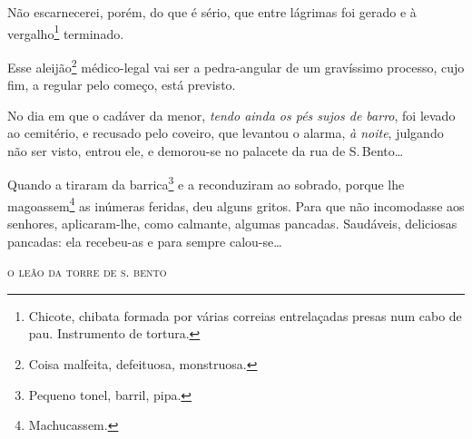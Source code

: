 Não escarnecerei, porém, do que é sério, que entre lágrimas foi gerado e
à vergalho\footnote{Chicote, chibata formada por várias correias
  entrelaçadas presas num cabo de pau. Instrumento de tortura.}
terminado.

Esse aleijão\footnote{Coisa malfeita, defeituosa, monstruosa.}
médico-legal vai ser a pedra-angular de um gravíssimo processo, cujo
fim, a regular pelo começo, está previsto.

No dia em que o cadáver da menor, \emph{tendo ainda os pés sujos de
barro}, foi levado ao cemitério, e recusado pelo coveiro, que levantou o
alarma, \emph{à noite}, julgando não ser visto, entrou ele, e demorou-se
no palacete da rua de S.\,Bento\ldots{}

Quando a tiraram da barrica\footnote{Pequeno tonel, barril, pipa.} e a
reconduziram ao sobrado, porque lhe magoassem\footnote{Machucassem.}
as inúmeras feridas, deu
alguns gritos. Para que não incomodasse aos senhores, aplicaram-lhe,
como calmante, algumas pancadas. Saudáveis, deliciosas pancadas: ela
recebeu-as e para sempre calou-se\ldots{}

\medskip
\hfill\textsc{o leão da torre de s. bento}


